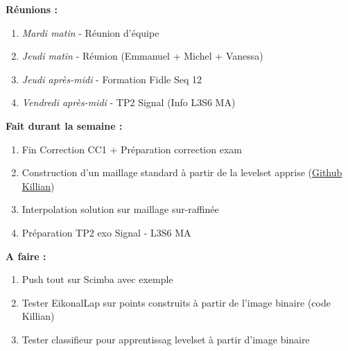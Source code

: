 \textbf{Réunions :}
\begin{enumerate}[label=\textbullet]
	\item \textit{Mardi matin} - Réunion d'équipe
	\item \textit{Jeudi matin} - Réunion (Emmanuel + Michel + Vanessa)
	\item \textit{Jeudi après-midi} - Formation Fidle Seq 12
	\item \textit{Vendredi après-midi} - TP2 Signal (Info L3S6 MA)
\end{enumerate}
\textbf{Fait durant la semaine :}
\begin{enumerate}[label=\textbullet]
	\item Fin Correction CC1 + Préparation correction exam
	\item Construction d'un maillage standard à partir de la levelset apprise (\href{https://github.com/KVuillemot/PhiFEM_and_FNO/blob/main/install_and_use_mmg.md }{Github Killian})
	\item Interpolation solution sur maillage sur-raffinée
	\item Préparation TP2 exo Signal - L3S6 MA
\end{enumerate}
\textbf{A faire :}
\begin{enumerate}[label=\textbullet]
	\item Push tout sur Scimba avec exemple
	\item Tester EikonalLap sur points construits à partir de l'image binaire (code Killian)
	\item Tester classifieur pour apprentissag levelset à partir d'image binaire
\end{enumerate}